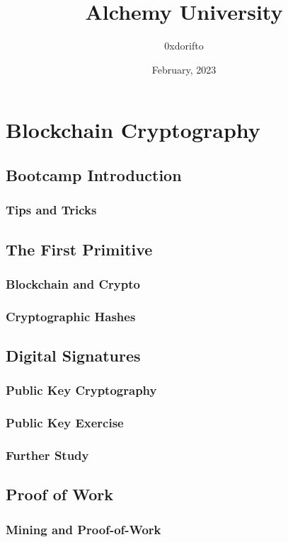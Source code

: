 \documentclass[a4paper, oneside]{book}
\title{Alchemy University}
\author{0xdorifto}
\date{February, 2023}
\begin{document}
\maketitle

\tableofcontents

\chapter{Blockchain Cryptography}

\section{Bootcamp Introduction}
\subsection{Tips and Tricks}

\section{The First Primitive}
\subsection{Blockchain and Crypto}
\subsection{Cryptographic Hashes}

\section{Digital Signatures}
\subsection{Public Key Cryptography}
\subsection{Public Key Exercise}
\subsection{Further Study}

\section{Proof of Work}
\subsection{Mining and Proof-of-Work}
\end{document}
